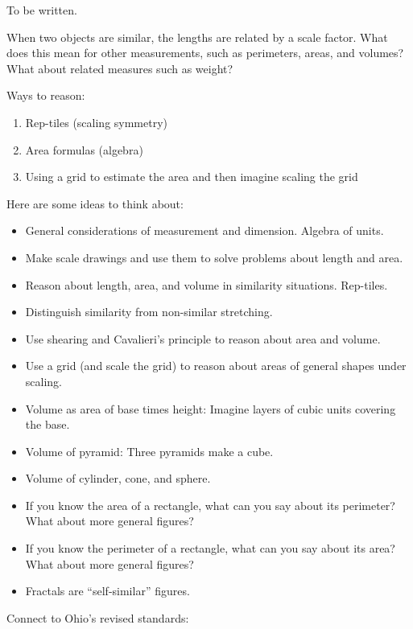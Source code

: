 To be written. 


\begin{teachingnote}
When two objects are similar, the lengths are related by a scale factor.  What does this mean for other measurements, such as perimeters, areas, and volumes?  What about related measures such as weight?  

Ways to reason: 
\begin{enumerate}
\item Rep-tiles (scaling symmetry)
\item Area formulas (algebra)
\item Using a grid to estimate the area and then imagine scaling the grid
\end{enumerate}

Here are some ideas to think about:  

\begin{itemize}\itemsep-2pt
\item General considerations of measurement and dimension.  Algebra of units.  
\item Make scale drawings and use them to solve problems about length and area.  
\item Reason about length, area, and volume in similarity situations.  Rep-tiles.    
\item Distinguish similarity from non-similar stretching.  
\item Use shearing and Cavalieri's principle to reason about area and volume.  
\item Use a grid (and scale the grid) to reason about areas of general shapes under scaling.  
\item Volume as area of base times height:  Imagine layers of cubic units covering the base.
\item Volume of pyramid:  Three pyramids make a cube.  
\item Volume of cylinder, cone, and sphere.
\item If you know the area of a rectangle, what can you say about its perimeter?  What about more general figures?  
\item If you know the perimeter of a rectangle, what can you say about its area?  What about more general figures?  
\item Fractals are ``self-similar'' figures.  
\end{itemize}

Connect to Ohio's revised standards: 


\end{teachingnote}
